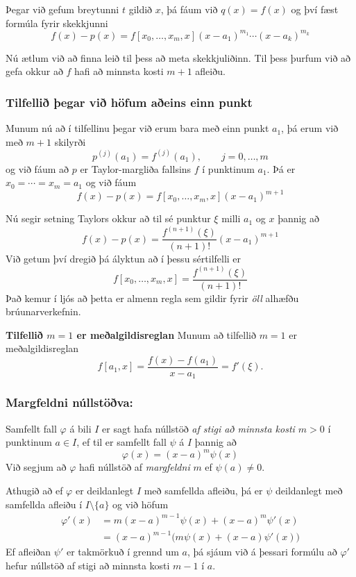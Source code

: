\documentclass[icelandic,a4paper,12pt]{article}
\begin{document}
\pause
Þegar við gefum breytunni $t$ gildið $x$, þá fáum við $q(x) = f(x)$
og  því fæst formúla fyrir skekkjunni
\begin{equation*}
  f(x) - p(x) 
  = f[x_0,\ldots,x_m,x](x-a_1)^{m_1}\cdots(x-a_k)^{m_k}
\end{equation*} 

\pause
Nú ætlum við að finna leið til þess að meta skekkjuliðinn. 
Til þess þurfum við að gefa okkur að $f$ hafi að minnsta kosti 
$m+1$ afleiðu.


\subsubsection{Tilfellið þegar við höfum aðeins einn punkt} 
Munum nú að í tilfellinu þegar við erum bara með einn punkt 
$a_1$, þá erum við með $m+1$ skilyrði 
$$p^{(j)}(a_1)=f^{(j)}(a_1), \qquad j=0,\dots,m
$$
og við fáum að $p$ er Taylor-margliða fallsins $f$ í punktinum $a_1$.
Þá er $x_0=\cdots=x_m=a_1$ og við fáum
\begin{equation*}
  f(x) - p(x) 
  = f[x_0,\ldots,x_m,x](x-a_1)^{m+1}
\end{equation*} 

\pause
Nú segir setning Taylors okkur að til sé punktur $\xi$ milli $a_1$ og
$x$ þannig að 
$$
  f(x) - p(x) 
  = \dfrac{f^{(n+1)}(\xi)}{(n+1)!}(x-a_1)^{m+1}
$$
Við getum því dregið þá ályktun að í þessu sértilfelli er
$$
f[x_0,\ldots,x_m,x]=\dfrac{f^{(n+1)}(\xi)}{(n+1)!}
$$
Það kemur í ljós að þetta er almenn regla sem gildir
fyrir {\it öll} alhæfðu brúunarverkefnin.


\textbf{Tilfellið $m=1$ er meðalgildisreglan} 
Munum að tilfellið $m=1$ er meðalgildisreglan
$$
f[a_1,x]=\dfrac{f(x)-f(a_1)}{x-a_1}=f'(\xi).
$$


\subsubsection{Margfeldni núllstöðva:} 

Samfellt fall $\varphi$ á bili $I$ er sagt hafa núllstöð {\it af stigi 
að minnsta kosti $m>0$} í punktinum $a\in I$, ef til er samfellt fall 
$\psi$ á $I$ þannig að 
$$
\varphi(x)=(x-a)^m\psi(x)
$$   
Við segjum að $\varphi$ hafi núllstöð af {\it margfeldni} $m$ ef
$\psi(a)\neq0$.

\pause
\smallskip
Athugið að ef $\varphi$ er deildanlegt  $I$ með samfellda afleiðu, 
þá er $\psi$ deildanlegt með samfellda afleiðu í $I\setminus\{a\}$ og 
við höfum
\begin{align*}
  \varphi'(x)&=m(x-a)^{m-1}\psi(x)+(x-a)^m\psi'(x)\\
&= (x-a)^{m-1} \big(m\psi(x)+(x-a)\psi'(x)\big)
\end{align*}
Ef afleiðan $\psi'$ er takmörkuð í grennd um $a$, þá sjáum við á
þessari formúlu að 
$\varphi'$ hefur núllstöð af stigi að minnsta kosti $m-1$ í $a$.
\end{document}
